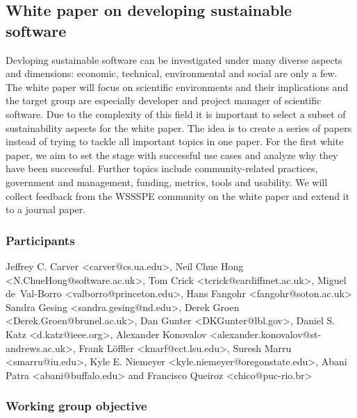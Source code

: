 \subsection{White paper on developing sustainable software}
\label{sec:best-practices-developing}



Devloping sustainable software can be investigated under many diverse aspects and dimensions: 
economic, technical, environmental and social are only a few. The white paper will focus 
on scientific environments and their implications and the target group are especially developer 
and project manager of scientific software. Due to the complexity of this field it is important to select
a subset of sustainability aspects for the white paper. The idea is to create a series of papers instead of trying
to tackle all important topics in one paper. For the first white paper, we aim to set the stage with successful use cases and analyze why they have been successful. Further topics include community-related practices, government and management, funding, metrics, tools and usability. We will collect feedback from the WSSSPE community on the white paper and extend it to a journal paper.

\subsubsection{Participants}

Jeffrey C. Carver <carver@cs.ua.edu>,
Neil Chue Hong <N.ChueHong@software.ac.uk>,
Tom Crick <tcrick@cardiffmet.ac.uk>,
Miguel de~Val-Borro <valborro@princeton.edu>,
Hans Fangohr <fangohr@soton.ac.uk>
Sandra Gesing <sandra.gesing@nd.edu>,
Derek Groen <Derek.Groen@brunel.ac.uk>,
Dan Gunter <DKGunter@lbl.gov>,
Daniel S. Katz <d.katz@ieee.org>,
Alexander Konovalov <alexander.konovalov@st-andrews.ac.uk>,
Frank L\"offler <knarf@cct.lsu.edu>,
Suresh Marru <smarru@iu.edu>,
Kyle E. Niemeyer <kyle.niemeyer@oregonstate.edu>,
Abani Patra <abani@buffalo.edu>
and
Francisco Queiroz <chico@puc-rio.br>

\subsubsection{Working group objective}

